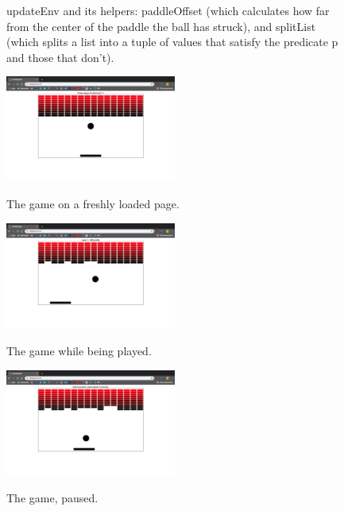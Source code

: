 \documentclass[12pt]{article}
\begin{document}
\begin{figure}[ht]
  \caption{updateEnv and its helpers: paddleOffset (which calculates how far from the center of the paddle the ball has struck), and splitList (which splits a list into a tuple of values that satisfy the predicate p and those that don't).}
  
  \label{fig:updateenv}
\end{figure}

\begin{figure}[ht]
  \centering
  \caption{The game on a freshly loaded page.}
  \includegraphics[width=0.5\textwidth]{prestart.png}
  \label{fig:prestart}
\end{figure}

\begin{figure}[ht]
  \centering
  \caption{The game while being played.}
  \includegraphics[width=0.5\textwidth]{going.png}
  \label{fig:going}
\end{figure}

\begin{figure}[ht]
  \centering
  \caption{The game, paused.}
  \includegraphics[width=0.5\textwidth]{paused.png}
  \label{fig:paused}
\end{figure}
\end{document}
